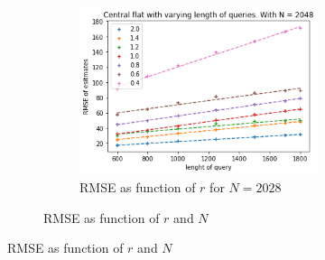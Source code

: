 \documentclass[11pt]{article}
\theoremstyle{definition}
\begin{document}
\begin{figure}[H]
\begin{subfigure}{.4\textwidth}
\begin{subfigure}{\textwidth}
  \includegraphics[width=\linewidth]{figures/central_flat/varying_r/cen_flat_varying_length_N_linear_=2048.png}
  \caption{RMSE as function of $r$ for $N=2028$}
  \label{fig:12}
\end{subfigure}
\caption{RMSE as function of $r$ and $N$}
\label{fig:13}
\end{subfigure}
\caption{RMSE as function of $r$ and $N$}
\label{fig:14}
\end{figure}
\end{document}
